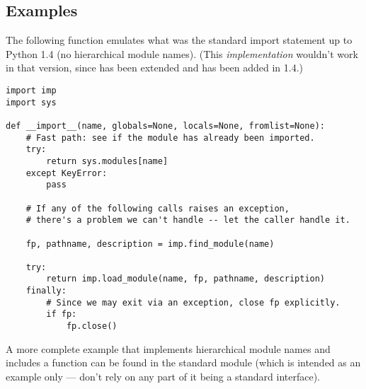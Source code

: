 \subsection{Examples}
\label{examples-imp}

The following function emulates what was the standard import statement
up to Python 1.4 (no hierarchical module names).  (This
\emph{implementation} wouldn't work in that version, since
 has been extended and
 has been added in 1.4.)

\begin{verbatim}
import imp
import sys

def __import__(name, globals=None, locals=None, fromlist=None):
    # Fast path: see if the module has already been imported.
    try:
        return sys.modules[name]
    except KeyError:
        pass

    # If any of the following calls raises an exception,
    # there's a problem we can't handle -- let the caller handle it.

    fp, pathname, description = imp.find_module(name)
    
    try:
        return imp.load_module(name, fp, pathname, description)
    finally:
        # Since we may exit via an exception, close fp explicitly.
        if fp:
            fp.close()
\end{verbatim}

A more complete example that implements hierarchical module names and
includes a  function can be
found in the standard module  (which
is intended as an example only --- don't rely on any part of it being
a standard interface).
